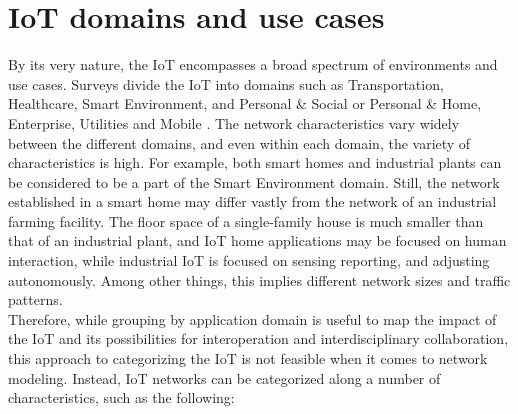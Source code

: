\documentclass{acm_proc_article-sp}
\begin{document}
\section{IoT domains and use cases}
\label{sec:Scenarios}
By its very nature, the IoT encompasses a broad spectrum of environments and use cases.
Surveys divide the IoT into domains such as Transportation, Healthcare, Smart Environment, and Personal \& Social \cite{IoT_survey_Atzori} or Personal \& Home, Enterprise, Utilities and Mobile \cite{IoT_survey_Gubbi}.
The network characteristics vary widely between the different domains, and even within each domain, the variety of characteristics is high. For example, both smart homes and industrial plants can be considered to be a part of the Smart Environment domain\cite{IoT_survey_Atzori}. Still, the network established in a smart home may differ vastly from the network of an industrial farming facility. The floor space of a single-family house is much smaller than that of an industrial plant, and IoT home applications may be focused on human interaction, while industrial IoT is focused on sensing reporting, and adjusting autonomously\cite{RFC-5867}. Among other things, this implies different network sizes and traffic patterns.\\
Therefore, while grouping by application domain is useful to map the impact of the IoT and its possibilities for interoperation and interdisciplinary collaboration, this approach to categorizing the IoT is not feasible when it comes to network modeling. Instead, IoT networks can be categorized along a number of characteristics, such as the following:
\end{document}
